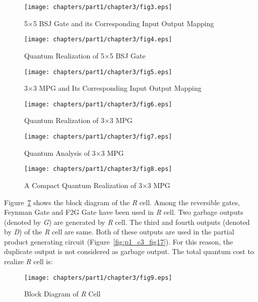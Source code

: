 \begin{figure}[!tbh]
	\centering
	\texttt{[image: chapters/part1/chapter3/fig3.eps]}
	\caption{{5$\times $5} BSJ Gate and its Corresponding Input Output Mapping}
	\label{fig:p1_c3_fig3}
\end{figure}


\begin{figure}[!tbh]
	\centering
	\texttt{[image: chapters/part1/chapter3/fig4.eps]}
	\caption{Quantum Realization of {5$\times $5} BSJ Gate}
	\label{fig:p1_c3_fig4}
\end{figure}

\begin{figure}[!tbh]
	\centering
	\texttt{[image: chapters/part1/chapter3/fig5.eps]}
	\caption{{3$\times $3} MPG and Its Corresponding Input Output Mapping}
	\label{fig:p1_c3_fig5}
\end{figure}


\begin{figure}[!tbh]
	\centering
	\texttt{[image: chapters/part1/chapter3/fig6.eps]}
	\caption{Quantum Realization of {3$\times $3} MPG}
	\label{fig:p1_c3_fig6}
\end{figure}

\begin{figure}[!tbh]
	\centering
	\texttt{[image: chapters/part1/chapter3/fig7.eps]}
	\caption{Quantum Analysis of {3$\times $3 }MPG}
	\label{fig:p1_c3_fig7}
\end{figure}

\begin{figure}[!tbh]
	\centering
	\texttt{[image: chapters/part1/chapter3/fig8.eps]}
	\caption{A Compact Quantum Realization of 3$\times $3 MPG}
	\label{fig:p1_c3_fig8}
\end{figure}

Figure~\ref{fig:p1_c3_fig9} shows the block diagram of the \textit{R} cell. Among the reversible gates, Feynman Gate and F2G Gate have been used in \textit{R} cell. Two garbage outputs (denoted by \textit{G}) are generated by \textit{R} cell. The third and fourth outputs (denoted by \textit{D}) of the \textit{R} cell are same. Both of these outputs are used in the partial product generating circuit (Figure~\ref{fig:p1_c3_fig17}). For this reason, the duplicate output is not considered as garbage output. The total quantum cost to realize \textit{R} cell is:
\begin{figure}[!tbh]
	\centering
	\texttt{[image: chapters/part1/chapter3/fig9.eps]}
	\caption{Block Diagram of \textit{R} Cell}
	\label{fig:p1_c3_fig9}
\end{figure}


